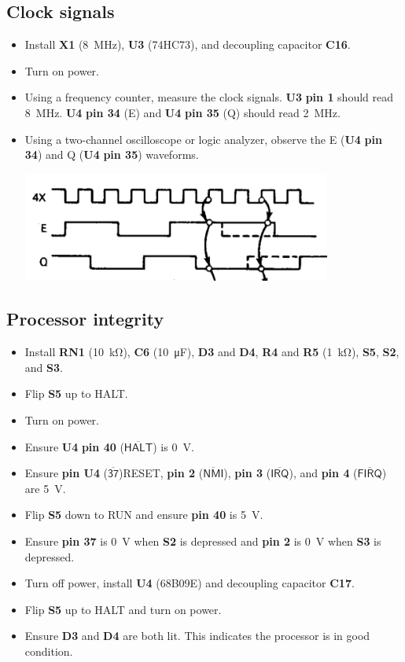 \documentclass[letterpaper,11pt]{article}
\newcommand{\net}[1]{\textsf{#1}}
\newcommand{\Net}[1]{\ensuremath{\overline{\textsf{#1}}}}
\newcommand{\pin}[1]{\textbf{pin #1}}
\newcommand{\Npin}[2]{\pin{#1} (\Net{#2})}
\newcommand{\rpin}[2]{\refdes{#1} \pin{#2}}
\newcommand{\rnpin}[3]{\refdes{#1} \pin{#2} (\net{#3})}
\newcommand{\rNpin}[3]{\refdes{#1} \pin{#2} (\Net{#3})}
\newcommand{\refdes}[1]{\textbf{#1}}
\newcommand{\kohm}[1]{\SI{#1}{\kilo\ohm}}
\newcommand{\uF}[1]{\SI{#1}{\micro\farad}}
\newcommand{\V}[1]{\SI{#1}{\volt}}
\newcommand{\MHz}[1]{\SI{#1}{\mega\hertz}}
\begin{document}
\subsection{Clock signals}
\begin{itemize}
\item Install \refdes{X1} (\MHz{8}), \refdes{U3} (74HC73), and decoupling capacitor \refdes{C16}.
\item Turn on power.
\item Using a frequency counter, measure the clock signals. \rpin{U3}{1} should read \MHz{8}. \rnpin{U4}{34}{E} and \rnpin{U4}{35}{Q} should read \MHz{2}.
\item Using a two-channel oscilloscope or logic analyzer, observe the \net{E} (\rpin{U4}{34}) and \net{Q} (\rpin{U4}{35}) waveforms.

\includegraphics[width=4in]{clockwaves.png}
\end{itemize}

\subsection{Processor integrity}
\begin{itemize}
\item Install \refdes{RN1} (\kohm{10}), \refdes{C6} (\uF{10}), \refdes{D3} and \refdes{D4}, \refdes{R4} and \refdes{R5} (\kohm{1}), \refdes{S5}, \refdes{S2}, and \refdes{S3}.
\item Flip \refdes{S5} up to HALT.
\item Turn on power.
\item Ensure \rNpin{U4}{40}{HALT} is \V{0}.
\item Ensure \Npin{U4}{37}{RESET}, \Npin{2}{NMI}, \Npin{3}{IRQ}, and \Npin{4}{FIRQ} are \V{5}.
\item Flip \refdes{S5} down to RUN and ensure \pin{40} is \V{5}.
\item Ensure \pin{37} is \V{0} when \refdes{S2} is depressed and \pin{2} is \V{0} when \refdes{S3} is depressed.
\item Turn off power, install \refdes{U4} (68B09E) and decoupling capacitor \refdes{C17}.
\item Flip \refdes{S5} up to HALT and turn on power.
\item Ensure \refdes{D3} and \refdes{D4} are both lit. This indicates the processor is in good condition.
\end{itemize}
\end{document}
